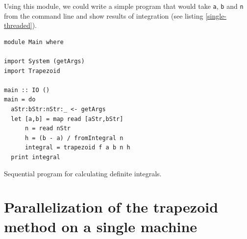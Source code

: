 \documentclass{tmr}
\begin{document}
Using this module, we could write a simple program that would take
\verb|a|, \verb|b| and \verb|n| from the command line and show results
of integration (see listing \ref{single-threaded}).

\begin{listing}
\begin{Verbatim}
module Main where

import System (getArgs)
import Trapezoid

main :: IO ()
main = do
  aStr:bStr:nStr:_ <- getArgs
  let [a,b] = map read [aStr,bStr]
      n = read nStr
      h = (b - a) / fromIntegral n
      integral = trapezoid f a b n h
  print integral 
\end{Verbatim}
\caption{Sequential program for calculating definite integrals. \label{single-threaded}}
\end{listing}


%



\section{Parallelization of the trapezoid method on a single machine}
\end{document}
